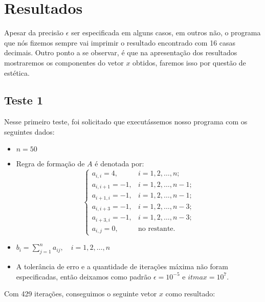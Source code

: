 \section{Resultados}
Apesar da precisão \(\epsilon\) ser especificada em alguns casos, em outros
não, o programa que nós fizemos sempre vai imprimir o resultado encontrado
com 16 casas decimais. Outro ponto a se observar, é que na apresentação dos
resultados mostraremos os componentes do vetor \(x\) obtidos, faremos isso
por questão de estética.

\subsection{Teste 1}
Nesse primeiro teste, foi solicitado que executássemos nosso programa com os seguintes dados:

	\begin{itemize}
		\item \(n = 50\)
		\item Regra de formação de \(A\) é denotada por:
		\[
			\begin{cases}
				a_{i,i} = 4,	& i = 1, 2, \ldots, n;\\
				a_{i,i+1} = -1,	& i = 1, 2, \ldots, n-1;\\
				a_{i+1,i} = -1,	& i = 1, 2, \ldots, n-1;\\
				a_{i,i+3} = -1,	& i = 1, 2, \ldots, n-3;\\
				a_{i+3,i} = -1,	& i = 1, 2, \ldots, n-3;\\
				a_{i,j} = 0,	& \mbox{no restante.}
			\end{cases}
		\]
		\item \(b_{i} = \sum_{j=1}^{n} a_{ij}, \quad i = 1, 2, \ldots, n\)
		\item A tolerância de erro e a quantidade de iterações máxima não foram especificadas,
			então deixamos como padrão \(\epsilon = 10^{-5}\) e \(itmax = 10^{7}\).
	\end{itemize}
Com 429 iterações, conseguimos o seguinte vetor \(x\) como resultado:
